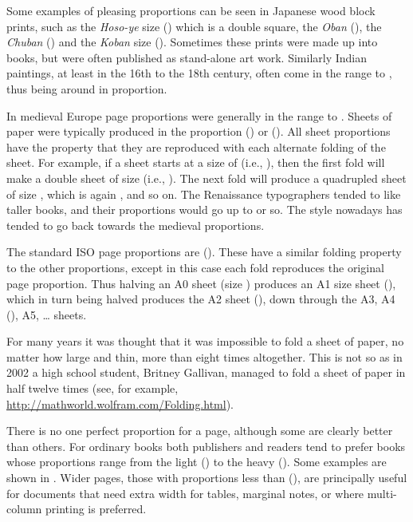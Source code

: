 \documentclass[10pt,a4paper,oneside,extrafontsizes]{memoir}%
\begin{document}
\begin{paracol}{2}
\switchEng
    Some examples of pleasing proportions can be
seen in Japanese wood block prints, such as the \textit{Hoso-ye} size
() which is a double square, the \textit{Oban} (), %
the \textit{Chuban} () and the \textit{Koban} size
(). Sometimes these prints were made up into books, but
were often published as stand-alone art work. Similarly Indian paintings,
at least in the 16th to the 18th century,
often come in the range  to , thus being around
 in proportion.

    In medieval Europe page proportions were generally in the range
 to . Sheets of paper were typically 
produced in the
proportion  () or  
(). 
All sheet proportions
have the property that they are reproduced with each alternate
folding of the sheet.
For example, if a sheet starts at a size of  
(i.e., ),
then the first fold will make a double sheet of size 
(i.e., ). The next fold will produce a quadrupled sheet of size
, which is again , and so on. 
 The Renaissance typographers tended to like taller books, and their 
proportions would go up to 
or so. The style nowadays has tended to go back towards the medieval
proportions.

    The standard ISO page proportions are 
 (). These
have a similar folding property to the other proportions, except in this case
each fold reproduces the original page proportion.
Thus halving an A0 sheet 
(size ) produces an A1 size sheet (),
which in turn being halved produces the A2 sheet (), down
through the A3, A4 (), A5, \ldots{} sheets.

For many years it was thought that it was impossible to fold a sheet of 
paper, no matter how large and thin, more than eight times 
altogether. This is not so as in 2002 a high school student, Britney Gallivan,
managed to fold a sheet of paper in half twelve times (see, for example,
\url{http://mathworld.wolfram.com/Folding.html}).


   There is no one perfect proportion for a page, 
although some are clearly better
than others. For ordinary books both publishers and readers tend to prefer
books whose proportions range from the light 
 () to the heavy
 (). Some examples are shown in .
 Wider pages, those with proportions less than
 (),
are principally useful for documents that need
extra width for tables, marginal notes, 
or where multi-column printing is preferred. 
\end{paracol}
\end{document}
